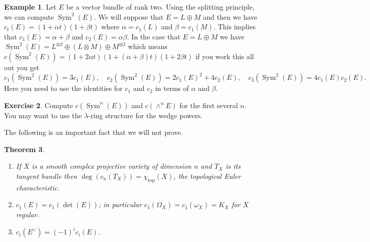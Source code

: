 \documentclass[12pt]{article}
\numberwithin{equation}{section}
\newtheorem{theorem}{Theorem}[subsection]
\theoremstyle{definition}
\newtheorem{example}[theorem]{Example}
\newtheorem{exercise}[theorem]{Exercise}
\theoremstyle{remark}
\newcommand{\Sym}{\operatorname{Sym}}
\renewcommand{\top}{\operatorname{top}}
\renewcommand{\top}{\operatorname{top}}
\begin{document}
\begin{example}
	Let $E$ be a vector bundle of rank two. Using the splitting principle, we can compute $\Sym^2(E)$.
	We will suppose that $E = L\oplus M$ and then we have $c_t(E) = (1+\alpha t)(1+\beta t)$ where $\alpha=c_1(L)$ and $\beta=c_1(M)$. 
	This implies that $c_1(E) = \alpha+\beta$ and $c_2(E) =\alpha\beta$. 
	In the case that $E=L\oplus M$ we have $\Sym^2(E) = L^{\otimes 2}\oplus (L\otimes M) \oplus M^{\otimes 2}$ which means $c(\Sym^2(E)) = (1+2\alpha t)(1+(\alpha+\beta) t)(1+2\beta t)$ if you work this all out you get 
	$$ c_1(\Sym^2(E)) = 3c_1(E), \quad c_2 (\Sym^2(E)) = 2c_1(E)^2+4c_2(E), \quad c_3(\Sym^2(E)) = 4c_1(E)c_2(E).$$
	Here you need to use the identities for $c_1$ and $c_2$ in terms of $\alpha$ and $\beta$.
\end{example}

\begin{exercise}
	Compute $c(\Sym^n(E))$ and $c(\wedge^nE)$ for the first several $n$. 
	You may want to use the $\lambda$-ring structure for the wedge powers.
\end{exercise}



The following is an important fact that we will not prove. 
\begin{theorem}
	\begin{enumerate}
	\item If $X$ is a smooth complex projective variety of dimension $n$ and $T_X$ is its tangent bundle then $\deg(c_n(T_X)) = \chi_{\top}(X)$, the topological Euler characteristic. 
	\item $c_1(E) = c_1(\det(E))$; in particular $c_1(\Omega_X) = c_1(\omega_X)=K_X$ for $X$ regular.
	\item $c_i(E^{\vee}) = (-1)^i c_i(E)$. 
	\end{enumerate}
\end{theorem}
\end{document}
